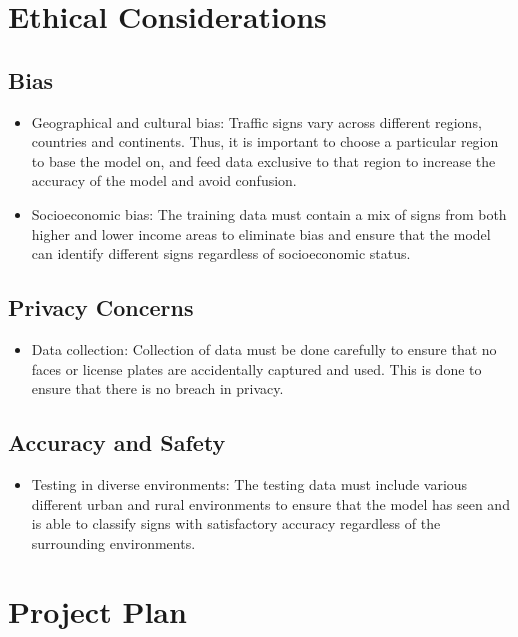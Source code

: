 \documentclass{article} %
\begin{document}
\section{Ethical Considerations}
\subsection*{Bias}
\begin{itemize}
    \item Geographical and cultural bias: Traffic signs vary across different regions, countries and continents. Thus, it is important to choose a particular region to base the model on, and feed data exclusive to that region to increase the accuracy of the model and avoid confusion.
    \item Socioeconomic bias: The training data must contain a mix of signs from both higher and lower income areas to eliminate bias and ensure that the model can identify different signs regardless of socioeconomic status.
\end{itemize}
\subsection*{Privacy Concerns}
\begin{itemize}
    \item Data collection: Collection of data must be done carefully to ensure that no faces or license plates are accidentally captured and used. This is done to ensure that there is no breach in privacy.
\end{itemize}

\subsection*{Accuracy and Safety}
\begin{itemize}
    \item Testing in diverse environments: The testing data must include various different urban and rural environments to ensure that the model has seen and is able to classify signs with satisfactory accuracy regardless of the surrounding environments.
\end{itemize}

\section{Project Plan}
\end{document}
